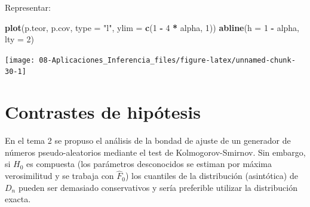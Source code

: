 \documentclass[]{book}
\newenvironment{Shaded}{\begin{snugshade}}{\end{snugshade}}
\newcommand{\KeywordTok}[1]{\textcolor[rgb]{0.13,0.29,0.53}{\textbf{#1}}}
\newcommand{\DataTypeTok}[1]{\textcolor[rgb]{0.13,0.29,0.53}{#1}}
\newcommand{\DecValTok}[1]{\textcolor[rgb]{0.00,0.00,0.81}{#1}}
\newcommand{\StringTok}[1]{\textcolor[rgb]{0.31,0.60,0.02}{#1}}
\newcommand{\OperatorTok}[1]{\textcolor[rgb]{0.81,0.36,0.00}{\textbf{#1}}}
\newcommand{\NormalTok}[1]{#1}
\theoremstyle{definition}
\theoremstyle{definition}
\theoremstyle{definition}
\theoremstyle{remark}
\let\BeginKnitrBlock\begin \let\EndKnitrBlock\end
\begin{document}
\begin{enumerate}
  Representar:

\begin{Shaded}
\begin{Highlighting}[]
\KeywordTok{plot}\NormalTok{(p.teor, p.cov, }\DataTypeTok{type =} \StringTok{"l"}\NormalTok{, }\DataTypeTok{ylim =} \KeywordTok{c}\NormalTok{(}\DecValTok{1} \OperatorTok{-}\StringTok{ }\DecValTok{4} \OperatorTok{*}\StringTok{ }\NormalTok{alpha, }\DecValTok{1}\NormalTok{))}
\KeywordTok{abline}\NormalTok{(}\DataTypeTok{h =} \DecValTok{1} \OperatorTok{-}\StringTok{ }\NormalTok{alpha, }\DataTypeTok{lty =} \DecValTok{2}\NormalTok{) }
\end{Highlighting}
\end{Shaded}

  \begin{center}\texttt{[image: 08-Aplicaciones\_Inferencia\_files/figure-latex/unnamed-chunk-30-1]} \end{center}
\end{enumerate}

\section{Contrastes de hipótesis}\label{contrastes-de-hipotesis}

\BeginKnitrBlock{exercise}
\protect\hypertarget{exr:unnamed-chunk-31}{}{\label{exr:unnamed-chunk-31} }
\EndKnitrBlock{exercise}

En el tema 2 se propuso el análisis de la bondad de ajuste de un
generador de números pseudo-aleatorios mediante el test de
Kolmogorov-Smirnov. Sin embargo, si \(H_{0}\) es compuesta (los
parámetros desconocidos se estiman por máxima verosimilitud y se trabaja
con \(\hat{F}_{0}\)) los cuantiles de la distribución (asintótica) de
\(D_{n}\) pueden ser demasiado conservativos y sería preferible utilizar
la distribución exacta.
\end{document}
